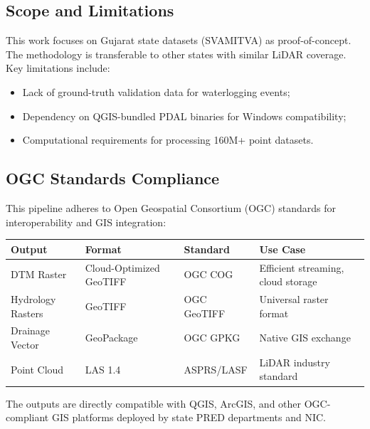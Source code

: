 \documentclass[a4paper,12pt]{article}
\begin{document}
\subsection{Scope and Limitations}

This work focuses on Gujarat state datasets (SVAMITVA) as proof-of-concept. The methodology is transferable to other states with similar LiDAR coverage. Key limitations include:
\begin{itemize}
	\item Lack of ground-truth validation data for waterlogging events;
	\item Dependency on QGIS-bundled PDAL binaries for Windows compatibility;
	\item Computational requirements for processing 160M+ point datasets.
\end{itemize}

\subsection{OGC Standards Compliance}

This pipeline adheres to Open Geospatial Consortium (OGC) standards for interoperability and GIS integration:

{\small
\begin{table}[H]
	\centering
	\begin{tabular}{|l|l|l|l|}
		\hline
		\textbf{Output}   & \textbf{Format}         & \textbf{Standard} & \textbf{Use Case}                  \\
		\hline
		DTM Raster        & Cloud-Optimized GeoTIFF & OGC COG           & Efficient streaming, cloud storage \\
		\hline
		Hydrology Rasters & GeoTIFF                 & OGC GeoTIFF       & Universal raster format            \\
		\hline
		Drainage Vector   & GeoPackage              & OGC GPKG          & Native GIS exchange                \\
		\hline
		Point Cloud       & LAS 1.4                 & ASPRS/LASF        & LiDAR industry standard            \\
		\hline
	\end{tabular}
\end{table}
}

\bigskip

The outputs are directly compatible with QGIS, ArcGIS, and other OGC-compliant GIS platforms deployed by state PRED departments and NIC.

\bigskip
\end{document}
